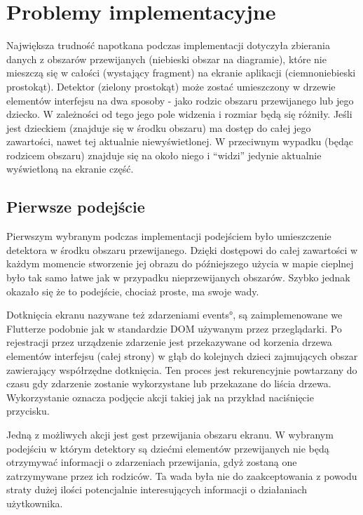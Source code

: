 \section{Problemy implementacyjne}
Największa trudność napotkana podczas implementacji dotyczyła zbierania danych z obszarów przewijanych (niebieski obszar na diagramie), które nie mieszczą się w całości (wystający fragment) na ekranie aplikacji (ciemnoniebieski prostokąt). Detektor (zielony prostokąt) może zostać umieszczony w drzewie elementów interfejsu na dwa sposoby - jako rodzic obszaru przewijanego lub jego dziecko. W zależności od tego jego pole widzenia i rozmiar będą się różniły. Jeśli jest dzieckiem (znajduje się w środku obszaru) ma dostęp do całej jego zawartości, nawet tej aktualnie niewyświetlonej. W przeciwnym wypadku (będąc rodzicem obszaru) znajduje się na około niego i ``widzi'' jedynie aktualnie wyświetloną na ekranie część.


\subsection{Pierwsze podejście}
Pierwszym wybranym podczas implementacji podejściem było umieszczenie detektora w środku obszaru przewijanego. Dzięki dostępowi do całej zawartości w każdym momencie stworzenie jej obrazu do późniejszego użycia w mapie cieplnej było tak samo łatwe jak w przypadku nieprzewijanych obszarów. Szybko jednak okazało się że to podejście, chociaż proste, ma swoje wady.

Dotknięcia ekranu nazywane też zdarzeniami \ang{events}, są zaimplemenowane we Flutterze podobnie jak w standardzie DOM używanym przez przeglądarki. Po rejestracji przez urządzenie zdarzenie jest przekazywane od korzenia drzewa elementów interfejsu (całej strony) w głąb do kolejnych dzieci zajmujących obszar zawierający współrzędne dotknięcia. Ten proces jest rekurencyjnie powtarzany do czasu gdy zdarzenie zostanie wykorzystane lub przekazane do liścia drzewa. Wykorzystanie oznacza podjęcie akcji takiej jak na przykład naciśnięcie przycisku.

Jedną z możliwych akcji jest gest przewijania obszaru ekranu. W wybranym podejściu w którym detektory są dziećmi elementów przewijanych nie będą otrzymywać informacji o zdarzeniach przewijania, gdyż zostaną one zatrzymywane przez ich rodziców. Ta wada była nie do zaakceptowania z powodu straty dużej ilości potencjalnie interesujących informacji o działaniach użytkownika.

